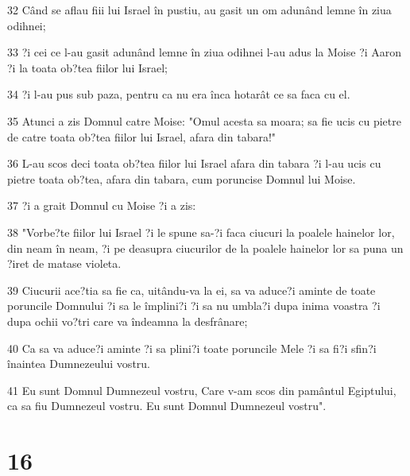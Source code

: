 \par 32 Când se aflau fiii lui Israel în pustiu, au gasit un om adunând lemne în ziua odihnei;
\par 33 ?i cei ce l-au gasit adunând lemne în ziua odihnei l-au adus la Moise ?i Aaron ?i la toata ob?tea fiilor lui Israel;
\par 34 ?i l-au pus sub paza, pentru ca nu era înca hotarât ce sa faca cu el.
\par 35 Atunci a zis Domnul catre Moise: "Omul acesta sa moara; sa fie ucis cu pietre de catre toata ob?tea fiilor lui Israel, afara din tabara!"
\par 36 L-au scos deci toata ob?tea fiilor lui Israel afara din tabara ?i l-au ucis cu pietre toata ob?tea, afara din tabara, cum poruncise Domnul lui Moise.
\par 37 ?i a grait Domnul cu Moise ?i a zis:
\par 38 "Vorbe?te fiilor lui Israel ?i le spune sa-?i faca ciucuri la poalele hainelor lor, din neam în neam, ?i pe deasupra ciucurilor de la poalele hainelor lor sa puna un ?iret de matase violeta.
\par 39 Ciucurii ace?tia sa fie ca, uitându-va la ei, sa va aduce?i aminte de toate poruncile Domnului ?i sa le împlini?i ?i sa nu umbla?i dupa inima voastra ?i dupa ochii vo?tri care va îndeamna la desfrânare;
\par 40 Ca sa va aduce?i aminte ?i sa plini?i toate poruncile Mele ?i sa fi?i sfin?i înaintea Dumnezeului vostru.
\par 41 Eu sunt Domnul Dumnezeul vostru, Care v-am scos din pamântul Egiptului, ca sa fiu Dumnezeul vostru. Eu sunt Domnul Dumnezeul vostru".

\chapter{16}


